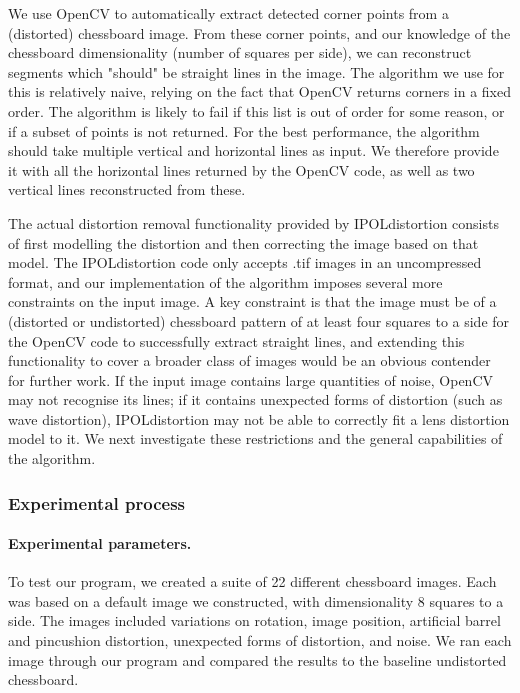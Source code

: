 We use OpenCV to automatically extract detected corner points from a (distorted) chessboard image. From these corner points, and our knowledge of the chessboard dimensionality (number of squares per side), we can reconstruct segments which "should" be straight lines in the image. The algorithm we use for this is relatively naive, relying on the fact that OpenCV returns corners in a fixed order. The algorithm is likely to fail if this list is out of order for some reason, or if a subset of points is not returned. For the best performance, the algorithm should take multiple vertical and horizontal lines as input. We therefore provide it with all the horizontal lines returned by the OpenCV code, as well as two vertical lines reconstructed from these.

The actual distortion removal functionality provided by IPOLdistortion consists of first modelling the distortion and then correcting the image based on that model. The IPOLdistortion code only accepts .tif images in an uncompressed format, and our implementation of the algorithm imposes several more constraints on the input image. A key constraint is that the image must be of a (distorted or undistorted) chessboard pattern of at least four squares to a side for the OpenCV code to successfully extract straight lines, and extending this functionality to cover a broader class of images would be an obvious contender for further work. If the input image contains large quantities of noise, OpenCV may not recognise its lines; if it contains unexpected forms of distortion (such as wave distortion), IPOLdistortion may not be able to correctly fit a lens distortion model to it. We next investigate these restrictions and the general capabilities of the algorithm.

\subsubsection{Experimental process}

\paragraph{Experimental parameters.}
To test our program, we created a suite of 22 different chessboard images. Each was based on a default image we constructed, with dimensionality 8 squares to a side. The images included variations on rotation, image position, artificial barrel and pincushion distortion, unexpected forms of distortion, and noise. We ran each image through our program and compared the results to the baseline undistorted chessboard.

